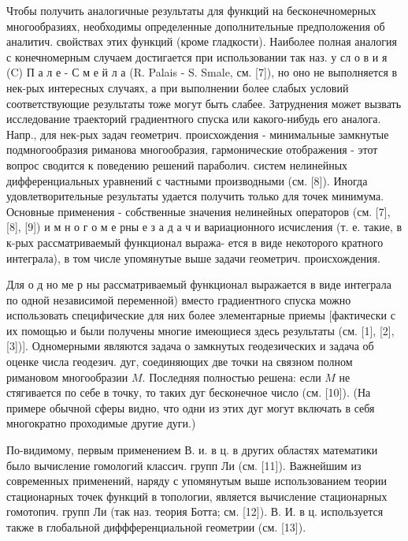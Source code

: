 \documentclass[10pt]{article}
\begin{document}
Чтобы получить аналогичные результаты для функций на бесконечномерных многообразиях, необходимы определенные дополнительные предположения об аналитич. свойствах этих функций (кроме гладкости). Наиболее полная аналогия с конечномерным случаем достигается при использовании так наз. у сл о в и я (C) П а л е - С м е й л а (R. Palais - S. Smale, см. [7]), но оно не выполняется в нек-рых интересных случаях, а при выполнении более слабых условий соответствующие результаты тоже могут быть слабее. Затруднения может вызвать исследование траекторий градиентного спуска или какого-нибудь его аналога. Напр., для нек-рых задач геометрич. происхождения - минимальные замкнутые подмногообразия риманова многообразия, гармонические отображения - этот вопрос сводится к поведению решений параболич. систем нелинейных дифференциальных уравнений с частными производными (см. [8]). Иногда удовлетворительные результаты удается получить только для точек минимума. Основные применения - собственные значения нелинейных операторов (см. [7], [8], [9]) и м н о г о м е рны е з а д а ч и вариационного исчисления (т. е. такие, в к-рых рассматриваемый функционал выража- ется в виде некоторого кратного интеграла), в том числе упомянутые выше задачи геометрич. происхождения.



Для о д но ме р ны рассматриваемый функционал выражается в виде интеграла по одной независимой переменной) вместо градиентного спуска можно использовать специфические для них более элементарные приемы [фактически с их помощью и были получены многие имеющиеся здесь результаты (см. [1], [2], [3])]. Одномерными являются задача о замкнутых геодезических и задача об оценке числа геодезич. дуг, соединяющих две точки на связном полном римановом многообразии $M$. Последняя полностью решена: если $M$ не стягивается по себе в точку, то таких дуг бесконечное число (см. [10]). (На примере обычной сферы видно, что одни из этих дуг могут включать в себя многократно проходимые другие дуги.)



По-видимому, первым применением В. и. в ц. в других областях математики было вычисление гомологий классич. групп Ли (см. [11]). Важнейшим из современных применений, наряду с упомянутым выше использованием теории стационарных точек функций в топологии, является вычисление стационарных гомотопич. групп Ли (так наз. теория Ботта; см. [12]). В. И. в ц. используется также в глобальной диффференциальной геометрии (см. [13]).
\end{document}
